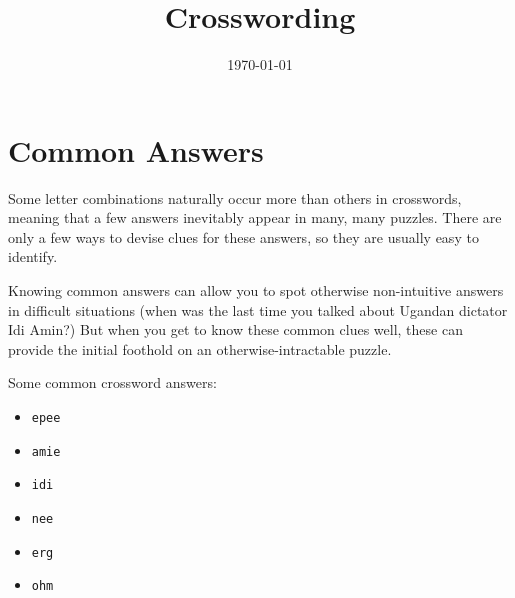 \documentclass{article}
\title{Crosswording}
\date{\today}
\begin{document}
\maketitle

\section{Common Answers}\label{common-answers}

Some letter combinations naturally occur more than others in crosswords,
meaning that a few answers inevitably appear in many, many puzzles.
There are only a few ways to devise clues for these answers, so they are
usually easy to identify.

Knowing common answers can allow you to spot otherwise non-intuitive
answers in difficult situations (when was the last time you talked about
Ugandan dictator Idi Amin?) But when you get to know these common clues
well, these can provide the initial foothold on an otherwise-intractable
puzzle.

Some common crossword answers:

\begin{itemize}

\item
  \texttt{epee}
\item
  \texttt{amie}
\item
  \texttt{idi}
\item
  \texttt{nee}
\item
  \texttt{erg}
\item
  \texttt{ohm}
\end{itemize}
\end{document}
